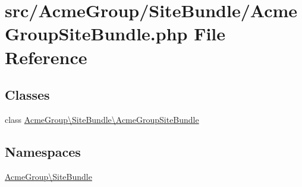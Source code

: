 \hypertarget{_acme_group_site_bundle_8php}{\section{src/\+Acme\+Group/\+Site\+Bundle/\+Acme\+Group\+Site\+Bundle.php File Reference}
\label{_acme_group_site_bundle_8php}
}
\subsection*{Classes}
\begin{DoxyCompactItemize}
\item 
class \hyperlink{class_acme_group_1_1_site_bundle_1_1_acme_group_site_bundle}{Acme\+Group\textbackslash{}\+Site\+Bundle\textbackslash{}\+Acme\+Group\+Site\+Bundle}
\end{DoxyCompactItemize}
\subsection*{Namespaces}
\begin{DoxyCompactItemize}
\item 
 \hyperlink{namespace_acme_group_1_1_site_bundle}{Acme\+Group\textbackslash{}\+Site\+Bundle}
\end{DoxyCompactItemize}
